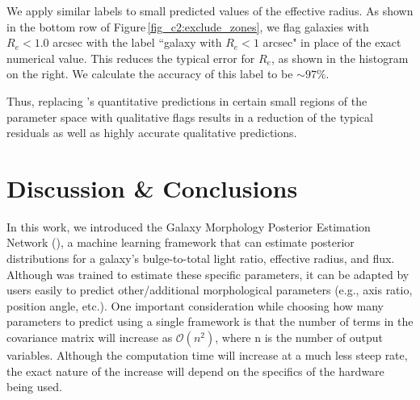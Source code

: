 We apply similar labels to small predicted values of the effective radius. As shown in the bottom row of Figure\,\ref{fig_c2:exclude_zones}, we flag galaxies with $R_e < 1.0$ arcsec with the label ``galaxy with $R_e < 1$ arcsec" in place of the exact numerical value. %
This reduces the typical error for $R_e$, as shown in the histogram on the right. We calculate the accuracy of this label to be $\sim97\%$.

Thus, replacing \gampen's quantitative predictions in certain small regions of the parameter space with qualitative flags results in a reduction of the typical residuals as well as highly accurate qualitative predictions.



\section{Discussion \& Conclusions} \label{sec_c2:conclusions}
In this work, we introduced the Galaxy Morphology Posterior Estimation Network (\gampen{}), a machine learning framework that can estimate posterior distributions for a galaxy's bulge-to-total light ratio, effective radius, and flux. Although \gampen{} was trained to estimate these specific parameters, it can be adapted by users easily to predict other/additional morphological parameters (e.g., axis ratio, position angle, etc.). One important consideration while choosing how many parameters to predict using a single \gampen{} framework is that the number of terms in the covariance matrix will increase as $\mathcal{O}(n^2)$, where n is the number of output variables. Although the computation time will increase at a much less steep rate, the exact nature of the increase will depend on the specifics of the hardware being used.


